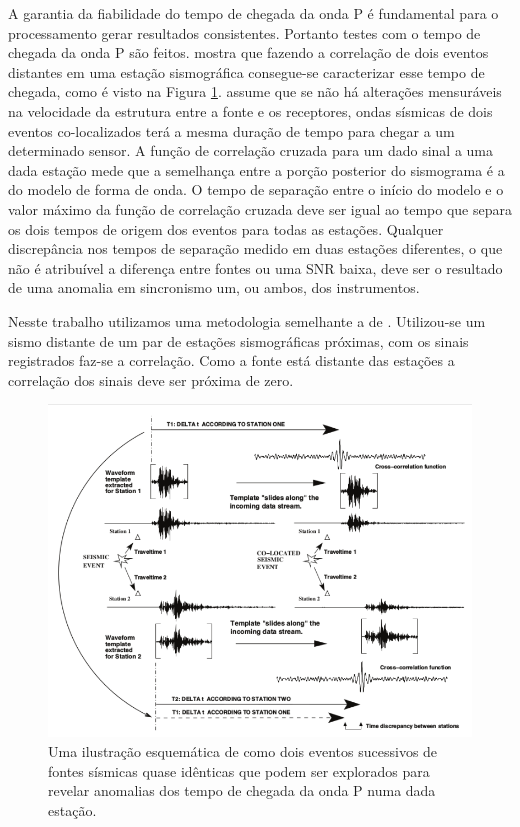 A garantia da fiabilidade do tempo de chegada da onda P é fundamental para o processamento gerar resultados consistentes. Portanto testes com o tempo de chegada da onda P são feitos. \cite{gibbons_identification_2006} mostra que fazendo a correlação de dois eventos distantes em uma estação sismográfica consegue-se caracterizar esse tempo de chegada, como é visto na Figura \ref{figura4}. \cite{gibbons_identification_2006} assume que  se não há alterações mensuráveis na velocidade da estrutura entre a fonte e os receptores, ondas sísmicas de dois eventos co-localizados terá a mesma duração de tempo para chegar a um determinado sensor. A função de correlação cruzada para um dado sinal a uma dada estação mede que a semelhança entre a porção posterior do sismograma é a do modelo de forma de onda. O tempo de separação entre o início do modelo e o valor máximo da função de correlação cruzada deve ser igual ao tempo que separa os dois tempos de origem dos eventos para todas as estações. Qualquer discrepância nos tempos de separação medido em duas estações diferentes, o que não é atribuível a diferença entre fontes ou uma SNR baixa, deve ser o resultado de uma anomalia em sincronismo um, ou ambos, dos instrumentos.

Nesste trabalho utilizamos uma metodologia semelhante a de \cite{gibbons_identification_2006}. Utilizou-se um sismo distante de um par de estações sismográficas próximas, com os sinais registrados faz-se a correlação. Como a fonte está distante das estações a correlação dos sinais deve ser próxima de zero.

\begin{figure}[!ht]
\centering
\includegraphics[scale=0.6]{correlacao_tempo_de_chegada.png}
\caption{Uma ilustração esquemática de como dois eventos sucessivos de fontes sísmicas quase idênticas que podem ser explorados para revelar anomalias dos tempo de chegada da onda P numa dada estação. \citep{gibbons_identification_2006} }
\label{figura4}
\end{figure}

